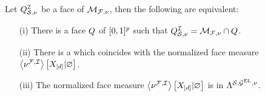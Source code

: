 \begin{theorem}
    \label{the:faceMeasureHardLogicNetworks}
    Let $Q^{\mathcal{I}}_{\mathcal{S},\nu}$ be a face of $\mathcal{M}_{\mathcal{F},\nu}$, then the following are equivalent:
    \begin{itemize}
        \item[(i)] There is a face $Q$ of $[0,1]^{p}$ such that $Q^{\mathcal{I}}_{\mathcal{S},\nu}=\mathcal{M}_{\mathcal{F},\nu}\cap Q$.
        \item[(ii)] There is a \HardLogicNetwork{} which coincides with the normalized face measure $\left\langle \nu^{\mathcal{F},\mathcal{I}}\right\rangle \left[ X_{[d]} | \varnothing \right]$.
        \item[(iii)] The normalized face measure $\left\langle \nu^{\mathcal{F},\mathcal{I}}\right\rangle \left[ X_{[d]} | \varnothing \right]$ is in $\Lambda^{\mathcal{S},\mathcal{G}^{\mathrm{EL}},\nu}$.
    \end{itemize}
\end{theorem}
